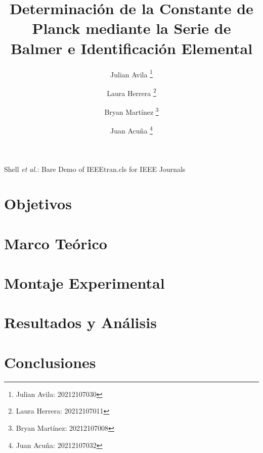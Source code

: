 \documentclass[journal, table]{IEEEtran}
\begin{document}
\title{Determinación de la Constante de Planck mediante la Serie de Balmer e Identificación Elemental}

\author[*]{Julian Avila
  \thanks{Julian Avila: 20212107030}}
\author[*]{Laura Herrera
  \thanks{Laura Herrera: 20212107011}}
\author[*]{Bryan Martínez
  \thanks{Bryan Martínez: 20212107008}}
\author[*]{Juan Acuña
  \thanks{Juan Acuña: 20212107032}}


\markboth{}
{Shell \MakeLowercase{\textit{et al.}}: Bare Demo of IEEEtran.cls for IEEE Journals}

\maketitle



\section{Objetivos}


\section{Marco Teórico}


\section{Montaje Experimental}


\section{Resultados y Análisis}


\section{Conclusiones}


\printbibliography
\end{document}
